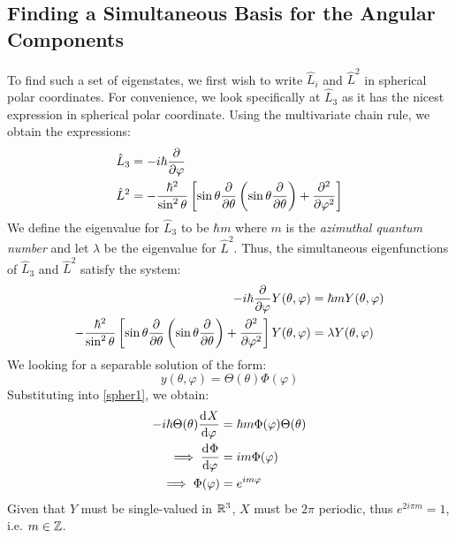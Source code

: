 \documentclass[../main.tex]{subfiles}
\begin{document}
\subsection{Finding a Simultaneous Basis for the Angular Components} \label{angBasis}
To find such a set of eigenstates, we first wish to write $\hat{L}_i$ and $\hat{L}^2$ in spherical polar coordinates.
For convenience, we look specifically at $\hat{L}_3$ as it has the nicest expression in spherical polar coordinate.
Using the multivariate chain rule, we obtain the expressions:
\begin{align}
  \hat{L}_3 &= -i\hbar \pderiv{}{\varphi} \nonumber \\
  \hat{L}^2 &= -\frac{\hbar^2}{\sin^2\theta}\left[\sin \theta \pderiv{}{\theta}\left(\sin \theta \pderiv{}{\theta}\right) + \pderiv[2]{}{\varphi}\right] \label{L2Spher}
\end{align}
We define the eigenvalue for $\hat{L}_3$ to be $\hbar m$ where $m$ is the \textit{azimuthal quantum number} and let $\lambda$ be the eigenvalue for $\hat{L}^2$.
Thus, the simultaneous eigenfunctions of $\hat{L}_3$ and $\hat{L}^2$ satisfy the system:
\begin{align}
  -i\hbar \pderiv{}{\varphi} Y(\theta, \varphi) &= \hbar m Y(\theta, \varphi) \label{spher1} \\
  -\frac{\hbar^2}{\sin^2\theta}\left[\sin \theta \pderiv{}{\theta}\left(\sin \theta \pderiv{}{\theta}\right) + \pderiv[2]{}{\varphi}\right] Y(\theta, \varphi) &= \lambda Y(\theta, \varphi) \label{spher2}
\end{align}
We looking for a separable solution of the form:
\[
  y(\theta, \varphi) = \Theta(\theta)\Phi(\varphi)
\]
Substituting into \cref{spher1}, we obtain:
\begin{align*}
  -i\hbar \Theta(\theta) \deriv{X}{\varphi} &= \hbar m \Phi(\varphi)\Theta(\theta) \\
  \implies \deriv{\Phi}{\varphi} &= i m\Phi(\varphi) \\
  \implies \Phi(\varphi) &= e^{im\varphi}
\end{align*}
Given that $Y$ must be single-valued in $\mathbb{R}^3$, $X$ must be $2\pi$ periodic, thus $e^{2i\pi m} = 1$, i.e. $m \in \mathbb{Z}$.
\end{document}
